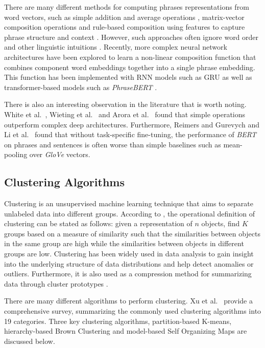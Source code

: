 There are many different methods for computing phrases representations from word vectors, such as simple addition and average operations \cite{Mitchell2010}, matrix-vector composition operations \cite{baroni-zamparelli-2010,zanzotto2010} and rule-based composition using features to capture phrase structure and context \cite{yu-dredze-2015}. However, such approaches often ignore word order and other linguistic intuitions \cite{zhu18sentence}. Recently, more complex neural network architectures have been explored to learn a non-linear composition function that combines component word embeddings together into a single phrase embedding. This function has been implemented with RNN models such as GRU \cite{zhou17} as well as transformer-based models such as \emph{PhraseBERT} \cite{PhraseBERT21}.

There is also an interesting observation in the literature that is worth noting. White et al.~\cite{White2015}, Wieting et al.~\cite{Wieting2016} and Arora et al.~\cite{Arora2017} found that simple operations outperform complex deep architectures. Furthermore, Reimers and Gurevych \cite{sentenceBERT2019} and Li et al.~\cite{sentenceEmb2020} found that without task-specific fine-tuning, the performance of \emph{BERT} on phrases and sentences is often worse than simple baselines such as mean-pooling over \emph{GloVe} vectors. 


\subsection{Clustering Algorithms}\label{sub:clusteringalgo}

Clustering is an unsupervised machine learning technique that aims to separate unlabeled data into different groups. According to \cite{Jain2010}, the operational definition of clustering can be stated as follows: given a representation of $n$ objects, find $K$ groups based on a measure of similarity such that the similarities between objects in the same group are high while the similarities between objects in different groups are low. Clustering has been widely used in data analysis to gain insight into the underlying structure of data distributions and help detect anomalies or outliers. Furthermore, it is also used as a compression method for summarizing data through cluster prototypes \cite{Jain2010}. 

There are many different algorithms to perform clustering. Xu et al.~\cite{Xu2015Survey} provide a comprehensive survey, summarizing the commonly used clustering algorithms into 19 categories. Three key clustering algorithms, partition-based K-means, hierarchy-based Brown Clustering and model-based Self Organizing Maps are discussed below.

